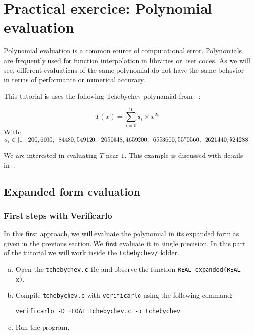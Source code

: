 \section{Practical exercice: Polynomial evaluation}

Polynomial evaluation is a common source of computational error. Polynomials are frequently used for function interpolation in libraries or user codes. As we will see, different evaluations of the same polynomial do not have the same behavior in terms of performance or numerical accuracy.

This tutorial is uses the following Tchebychev polynomial from ~\cite[pp.52-54]{parker1997monte}:

$$T(x)=\sum_{i=0}^{10}{a_i \times x^{2i}}$$
With:
$a_i \in [
  1,
  \matminus 200,
  6600,
  \matminus 84480,
  549120,
  \matminus 2050048,
  4659200,
  \matminus 6553600,
  5570560,
  \matminus 2621440,
  524288
]$

We are interested in evaluating  $T$ near $1$.
This example is discussed with details in~\cite[pp.52-54]{parker1997monte}.

\subsection{Expanded form evaluation}

\subsubsection{First steps with Verificarlo}

In this first approach, we will evaluate the polynomial in its expanded form as given in the previous section. We first evaluate it in single precision. In this part of the tutorial we will work inside the \texttt{tchebychev/} folder.

\begin{question}
  \begin{enumerate}[(a)]
  \item Open the {\tt tchebychev.c} file and observe the function {\tt REAL expanded(REAL x)}.

  \item Compile {\tt tchebychev.c} with {\tt verificarlo} using the following command:
\begin{verbatim}
verificarlo -D FLOAT tchebychev.c -o tchebychev
\end{verbatim}
  \item Run the program.
  \end{enumerate}
\end{question}

